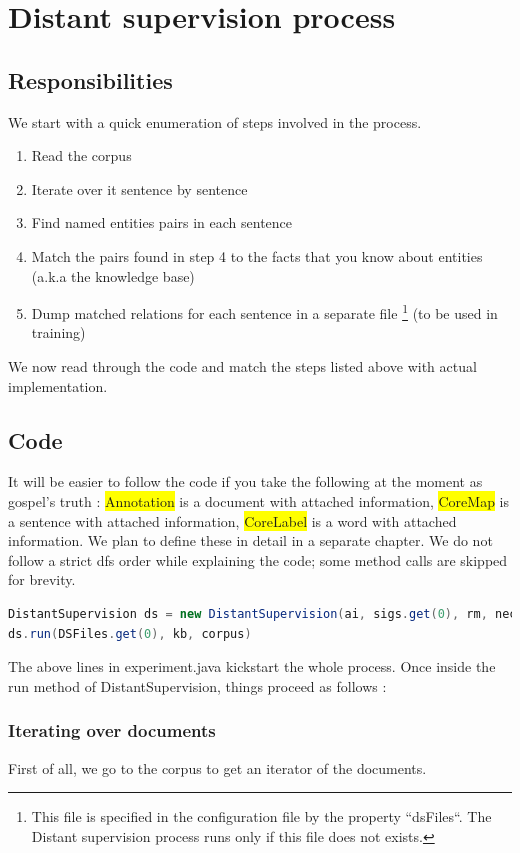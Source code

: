 \documentclass[a4paper,10pt]{report}
\newcommand{\hilight}[1]{\colorbox{yellow}{#1}}
\begin{document}
\section{Distant supervision process}
\subsection{Responsibilities} 
We start with a quick enumeration of steps involved in the process.
\begin{enumerate}
 \item Read the corpus
 \item Iterate over it sentence by sentence
 \item Find named entities pairs in each sentence
 \item Match the pairs found in step 4 to the facts that you know about entities (a.k.a the knowledge base)
 \item Dump matched relations for each sentence in a separate file \footnote{This file is specified in the configuration file by the property ``dsFiles``. The Distant supervision process runs only if this file does not exists.
} (to be used in training)
\end{enumerate}
We now read through the code and match the steps listed above with actual implementation.
\subsection{Code}
It will be easier to follow the code if you take the following at the moment as gospel's truth : 
\hilight{Annotation} is a document with attached information, \hilight{CoreMap} is a sentence with attached information, \hilight{CoreLabel} is a word with attached information. 
We plan to define these in detail in a separate chapter. We do not follow a strict dfs order while explaining the code; some method calls are skipped for brevity. 

\begin{lstlisting}[language=java]
DistantSupervision ds = new DistantSupervision(ai, sigs.get(0), rm, nec);
ds.run(DSFiles.get(0), kb, corpus)				
\end{lstlisting}
The above lines in experiment.java kickstart the whole process. Once inside the run method of DistantSupervision, things proceed as follows : 

\subsubsection{Iterating over documents}
First of all, we go to the corpus to get an iterator of the documents.
\end{document}
